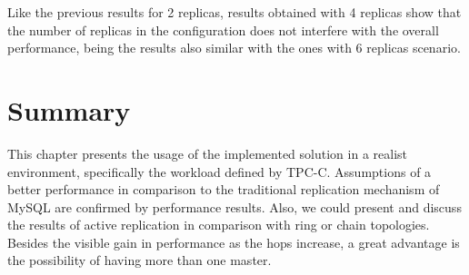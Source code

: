 Like the previous results for 2 replicas, results obtained with 4 replicas show that the number of replicas in the configuration does not interfere with the overall performance, being the results also similar with the ones with 6 replicas scenario.


\section{Summary}

This chapter presents the usage of the implemented solution in a realist environment, specifically the workload defined by TPC-C. Assumptions of a better performance in comparison to the traditional replication mechanism of MySQL are confirmed by performance results. Also, we could present and discuss the results of active replication in comparison with ring or chain topologies. Besides the visible gain in performance as the hops increase, a great advantage is the possibility of having more than one master.
 